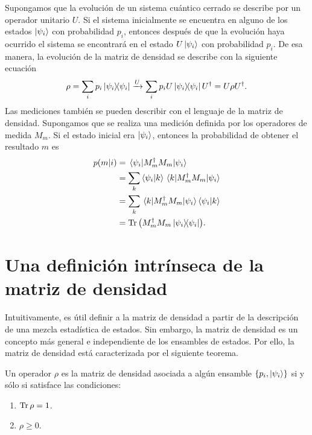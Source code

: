Supongamos que la evolución de un sistema cuántico cerrado se describe por
un operador unitario $U$. Si el sistema inicialmente se encuentra en alguno
de los estados $\ket{\psi_i}$ con probabilidad $p_i$, entonces después de que
la evolución haya ocurrido el sistema se encontrará en el estado $U\ket{\psi_i}$ 
con probabilidad $p_i$. De esa manera, la evolución de la matriz de densidad se
describe con la siguiente ecuación 
\begin{align}
	\rho = \sum _ip_i\dyad{\psii}{\psii}
	\xrightarrow[]{U}
	\sum _ip_iU\dyad{\psii}{\psii}U^{\dagger}	=
	U\rho U^{\dagger}.
\end{align}
Las mediciones también se pueden describir con el lenguaje de la matriz de
densidad. Supongamos que se realiza una medición definida por los
operadores de medida $M_m$. Si el estado inicial era $\ket{\psi_i}$, 
entonces la probabilidad de obtener el resultado $m$ es
\begin{align}
	p\qty(m|i) &= \matrixel{\psii}{M_m^{\dagger}M_m}{\psii}\\
	&= \sum _k \braket{\psii}{k}\matrixel{k}{M_m^{\dagger}M_m}{\psii}\\
	&=\sum _k \matrixel{k}{M_m^{\dagger}M_m}{\psii}\braket{\psii}{k}\\
	&=\Tr \qty(M_m^{\dagger}M_m\dyad{\psii}{\psii}).
\end{align}

\section{Una definición intrínseca de la matriz de densidad} %
Intuitivamente, es útil definir a la matriz de densidad a partir de la 
descripción de una mezcla estadística de estados. Sin embargo, la matriz 
de densidad es un concepto más general e independiente de los ensambles de
estados. Por ello, la matriz de densidad está caracterizada por el siguiente
teorema.  
\begin{teorema}
Un operador $\rho$ es la matriz de densidad asociada a algún ensamble 
$\{p_i, \ket{\psi _i} \}$ si y sólo si satisface las condiciones:
\begin{enumerate}
\item $\Tr \rho = 1$.
\item $\rho \geq 0$.
\end{enumerate}	
\end{teorema}

